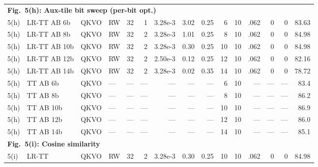 \documentclass[AMA,LATO1COL]{WileyNJDv5}
\begin{document}
{\begin{longtable}{@{}l l l l r r r r r r r r r r r@{}}
\multicolumn{15}{l}{\cellcolor{HeadGray}\textbf{Fig.~5(h): Aux-tile bit sweep (per-bit opt.)}} \\
5(h) & LR-TT AB 6b & QKVO & RW & 32 & 1 & 3.28e-3 & 3.02 & 0.25 & 6 & 10 & .062 & 0 & 0 & 83.63 \\
5(h) & LR-TT AB 8b & QKVO & RW & 32 & 2 & 3.28e-3 & 1.01 & 0.25 & 8 & 10 & .062 & 0 & 0 & 84.98 \\
5(h) & LR-TT AB 10b & QKVO & RW & 32 & 2 & 3.28e-3 & 0.30 & 0.25 & 10 & 10 & .062 & 0 & 0 & 84.98 \\
5(h) & LR-TT AB 12b & QKVO & RW & 32 & 2 & 2.50e-3 & 0.12 & 0.25 & 12 & 10 & .062 & 0 & 0 & 82.16 \\
5(h) & LR-TT AB 14b & QKVO & RW & 32 & 2 & 3.28e-3 & 0.02 & 0.35 & 14 & 10 & .062 & 0 & 0 & 78.72 \\
5(h) & TT AB 6b & QKVO & --- & --- & --- & --- & --- & --- & 6 & 10 & --- & --- & --- & 83.4 \\
5(h) & TT AB 8b & QKVO & --- & --- & --- & --- & --- & --- & 8 & 10 & --- & --- & --- & 86.2 \\
5(h) & TT AB 10b & QKVO & --- & --- & --- & --- & --- & --- & 10 & 10 & --- & --- & --- & 86.9 \\
5(h) & TT AB 12b & QKVO & --- & --- & --- & --- & --- & --- & 12 & 10 & --- & --- & --- & 86.0 \\
5(h) & TT AB 14b & QKVO & --- & --- & --- & --- & --- & --- & 14 & 10 & --- & --- & --- & 85.1 \\
\midrule

\multicolumn{15}{l}{\cellcolor{HeadGray}\textbf{Fig.~5(i): Cosine similarity}} \\
5(i) & LR-TT & QKVO & RW & 32 & 2 & 3.28e-3 & 0.30 & 0.25 & 10 & 10 & .062 & 0 & 0 & 84.98 \\
\midrule


\end{longtable}}
\end{document}
